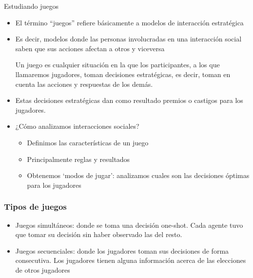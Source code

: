 \documentclass{beamer}
\begin{document}
\begin{frame}{Estudiando juegos}
    \begin{itemize}
        \item El término ``juegos'' refiere básicamente a modelos de interacción estratégica
        \item Es decir, modelos donde las personas involucradas en una interacción social saben que sus acciones afectan a otros y viceversa
        \begin{boxA}
            \centering
            Un juego es cualquier situación en la que los participantes, a los que llamaremos jugadores, toman decisiones estratégicas, es decir, toman en cuenta las acciones y respuestas de los demás.
        \end{boxA}
        \item Estas decisiones estratégicas dan como resultado premios o castigos para
        los jugadores.        
        \item ¿Cómo analizamos interacciones sociales?
        \begin{itemize}
            \item Definimos las características de un juego
            \item Principalmente reglas y resultados
            \item Obtenemos ‘modos de jugar’: analizamos cuales son las decisiones óptimas para los jugadores
        \end{itemize}
    \end{itemize}
\end{frame}

\begin{frame}
    \frametitle{Tipos de juegos}
    \begin{itemize}
        \item Juegos simultáneos: donde se toma una decisión one-shot. Cada agente tuvo que tomar su decisión sin haber observado las del resto.
        \item Juegos secuenciales: donde los jugadores toman sus decisiones de forma consecutiva. Los jugadores tienen alguna información acerca de las elecciones de otros jugadores
    \end{itemize}
\end{frame}
\end{document}
